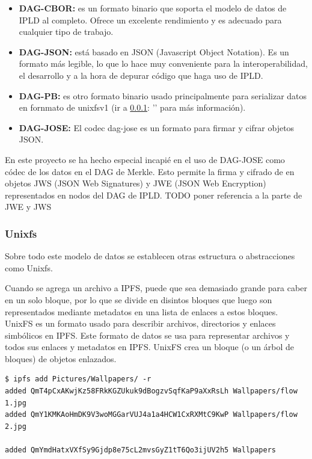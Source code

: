 \begin{itemize}[itemsep=1pt,nolistsep]
      \item \textbf{DAG-CBOR:} es un formato binario que soporta el modelo de datos de IPLD al completo. Ofrece un excelente rendimiento y es adecuado para cualquier tipo de trabajo.
      \item \textbf{DAG-JSON:} está basado en JSON (Javascript Object Notation). Es un formato más legible, lo que lo hace muy conveniente para la interoperabilidad, el desarrollo y a la hora de depurar código que haga uso de IPLD.
      \item \textbf{DAG-PB:} es otro formato binario usado principalmente para serializar datos en fornmato de unixfsv1 (ir a \ref{subsect:unixfs}: '' para más información).
      \item \textbf{DAG-JOSE:} El codec dag-jose es un formato para firmar y cifrar objetos JSON.
\end{itemize}

En este proyecto se ha hecho especial incapié en el uso de DAG-JOSE como códec de los datos en el DAG de Merkle. Esto permite la firma y cifrado de
en objetos JWS (JSON Web Signatures) y JWE (JSON Web Encryption) representados en nodos del DAG de IPLD.
TODO poner referencia a la parte de JWE y JWS

\subsubsection{Unixfs}\label{subsect:unixfs}
Sobre todo este modelo de datos se establecen otras estructura o abstracciones como Unixfs.

Cuando se agrega un archivo a IPFS, puede que sea demasiado grande para caber en un solo bloque, por lo que se divide en disintos bloques que luego son
representados mediante metadatos en una lista de enlaces a estos bloques. UnixFS es un formato usado para describir archivos, directorios y enlaces simbólicos en
IPFS. Este formato de datos se usa para representar archivos y todos sus enlaces y metadatos en IPFS. UnixFS crea un bloque (o un árbol de bloques) de objetos enlazados.

\begin{verbatim}
$ ipfs add Pictures/Wallpapers/ -r
added QmT4pCxAKwjKz58FRkKGZUkuk9dBogzvSqfKaP9aXxRsLh Wallpapers/flow 1.jpg
added QmY1KMKAoHmDK9V3woMGGarVUJ4a1a4HCW1CxRXMtC9KwP Wallpapers/flow 2.jpg

added QmYmdHatxVXfSy9Gjdp8e75cL2mvsGyZ1tT6Qo3ijUV2h5 Wallpapers
\end{verbatim}

